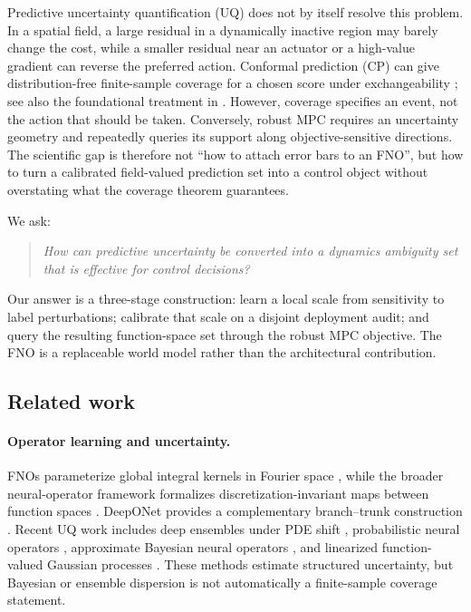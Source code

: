 \documentclass[10pt]{article}
\begin{document}
Predictive uncertainty quantification (UQ) does not by itself resolve this
problem. In a spatial field, a large residual in a dynamically inactive region
may barely change the cost, while a smaller residual near an actuator or a
high-value gradient can reverse the preferred action. Conformal prediction
(CP) can give distribution-free finite-sample coverage for a chosen score
under exchangeability \cite{angelopoulos2023gentle}; see also the foundational
treatment in \cite{vovk2005algorithmic}. However,
coverage specifies an event, not the action that should be taken. Conversely,
robust MPC requires an uncertainty geometry and repeatedly queries its support
along objective-sensitive directions. The scientific gap is therefore not
``how to attach error bars to an FNO'', but how to turn a calibrated
field-valued prediction set into a control object without overstating what the
coverage theorem guarantees.

We ask:
\begin{quote}
\emph{How can predictive uncertainty be converted into a dynamics ambiguity
set that is effective for control decisions?}
\end{quote}
Our answer is a three-stage construction: learn a local scale from sensitivity
to label perturbations; calibrate that scale on a disjoint deployment audit;
and query the resulting function-space set through the robust MPC objective.
The FNO is a replaceable world model rather than the architectural
contribution.

\subsection{Related work}

\paragraph{Operator learning and uncertainty.}
FNOs parameterize global integral kernels in Fourier space
\cite{li2021fno}, while the broader neural-operator framework formalizes
discretization-invariant maps between function spaces
\cite{kovachki2023neuraloperator}. DeepONet provides a complementary
branch--trunk construction \cite{lu2021deeponet}. Recent UQ work includes
deep ensembles under PDE shift \cite{mouli2024uq}, probabilistic neural
operators \cite{bulte2025probabilistic}, approximate Bayesian neural
operators \cite{magnani2025bayesian}, and linearized function-valued Gaussian
processes \cite{magnani2025luno}. These methods estimate structured
uncertainty, but Bayesian or ensemble dispersion is not automatically a
finite-sample coverage statement.
\end{document}
